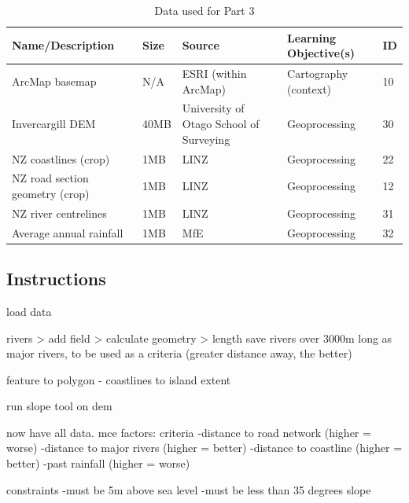\documentclass{article}
\begin{document}
\begin{table}[h]
\begin{center}
    \begin{tabular}{ | m{4cm} | m{1cm}| m{3.5cm} | m{5cm} | m{1cm} | } 
    \hline
    \cellcolor{red!35!blue!33!green!33!}\textbf{Name/Description} & 
    \cellcolor{red!35!blue!33!green!33!}\textbf{Size} &
    \cellcolor{red!35!blue!33!green!33!}\textbf{Source} &
    \cellcolor{red!35!blue!33!green!33!}\textbf{Learning Objective(s)} &
    \cellcolor{red!35!blue!33!green!33!}\textbf{ID} \\
    \hline
    ArcMap basemap & N/A & ESRI (within ArcMap) & Cartography (context) & 10 \\
    \hline
    Invercargill DEM & 40MB & University of Otago School of Surveying & Geoprocessing & 30 \\
    \hline
    NZ coastlines (crop) & 1MB & LINZ & Geoprocessing & 22 \\
    \hline
    NZ road section geometry (crop) & 1MB & LINZ & Geoprocessing & 12 \\
    \hline
    NZ river centrelines & 1MB & LINZ & Geoprocessing & 31 \\
    \hline
    Average annual rainfall & 1MB & MfE & Geoprocessing & 32 \\
    \hline
    \end{tabular}
\end{center}
\caption{\label{tb_data_3}Data used for Part 3}
\end{table}

\pagebreak

\subsection{Instructions}


load data

rivers > add field > calculate geometry > length
save rivers over 3000m long as major rivers, to be used as a criteria (greater distance away, the better)

feature to polygon - coastlines to island extent

run slope tool on dem

now have all data. mce factors:
criteria
-distance to road network (higher = worse)
-distance to major rivers (higher = better)
-distance to coastline (higher = better)
-past rainfall (higher = worse)

constraints
-must be 5m above sea level
-must be less than 35 degrees slope
\end{document}
